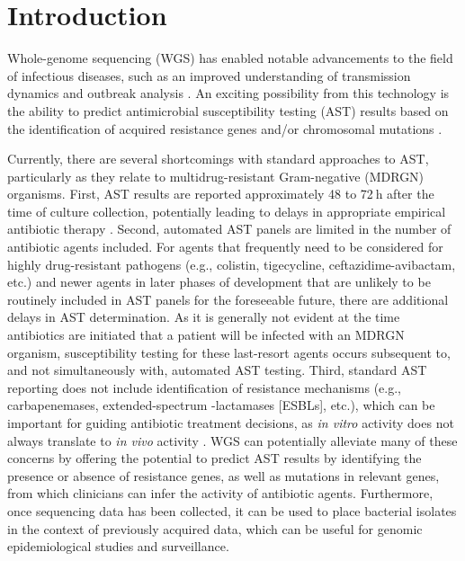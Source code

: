 \section{Introduction}
\label{sec:intro}

Whole-genome sequencing (WGS) has enabled notable advancements to the field of infectious diseases, such as an improved understanding of transmission dynamics and outbreak analysis \citep{Didelot2012-hg}. An exciting possibility from this technology is the ability to predict antimicrobial susceptibility testing (AST) results based on the identification of acquired resistance genes and/or chromosomal mutations \citep{Shelburne2017-dm}.

Currently, there are several shortcomings with standard approaches to AST, particularly as they relate to multidrug-resistant Gram-negative (MDRGN) organisms. First, AST results are reported approximately 48 to 72 h after the time of culture collection, potentially leading to delays in appropriate empirical antibiotic therapy \citep{Caliendo2013-yw}. Second, automated AST panels are limited in the number of antibiotic agents included. For agents that frequently need to be considered for highly drug-resistant pathogens (e.g., colistin, tigecycline, ceftazidime-avibactam, etc.) and newer agents in later phases of development that are unlikely to be routinely included in AST panels for the foreseeable future, there are additional delays in AST determination. As it is generally not evident at the time antibiotics are initiated that a patient will be infected with an MDRGN organism, susceptibility testing for these last-resort agents occurs subsequent to, and not simultaneously with, automated AST testing. Third, standard AST reporting does not include identification of resistance mechanisms (e.g., carbapenemases, extended-spectrum {\textbeta}-lactamases [ESBLs], etc.), which can be important for guiding antibiotic treatment decisions, as \textit{in vitro} activity does not always translate to \textit{in vivo} activity \citep{Tamma2017-el}. WGS can potentially alleviate many of these concerns by offering the potential to predict AST results by identifying the presence or absence of resistance genes, as well as mutations in relevant genes, from which clinicians can infer the activity of antibiotic agents. Furthermore, once sequencing data has been collected, it can be used to place bacterial isolates in the context of previously acquired data, which can be useful for genomic epidemiological studies and surveillance.

